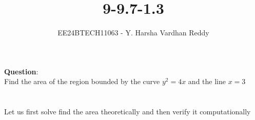 \documentclass[journal]{IEEEtran}
\begin{document}

\vspace{3cm}

\title{9-9.7-1.3}
\author{EE24BTECH11063 - Y. Harsha Vardhan Reddy}
 \maketitle
{\let\newpage\relax\maketitle}

\renewcommand{\thefigure}{\theenumi}
\renewcommand{\thetable}{\theenumi}
\setlength{\intextsep}{10pt} %


\renewcommand{\thetable}{\theenumi}

\textbf{Question}:\\
Find the area of the region bounded by the curve $y^2=4x$ and the line $x=3$\\
\solution \\
\\
Let us first solve find the area theoretically and then verify it computationally
\end{document}
